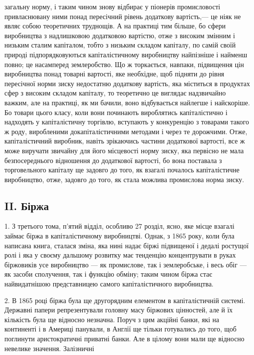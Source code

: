 \parcont{}  %
загальну норму, і таким чином знову відбирає у піонерів промисловості привласнювану ними понад пересічний рівень додаткову
вартість,— це ніяк не являє собою теоретичних труднощів. А на практиці тим більше, бо сфери виробництва з надлишковою
додатковою вартістю, отже з високим змінним і низьким сталим капіталом, тобто з низьким складом капіталу, по самій своїй
природі підпорядковуються капіталістичному виробництву найпізніше і найменш повно; це насамперед землеробство. Що ж
торкається, навпаки, підвищення цін виробництва понад товарні вартості, яке необхідне, щоб підняти до рівня пересічної норми
зиску недостатню додаткову вартість, яка міститься в продуктах сфер з високим складом капіталу, то теоретично це виглядає
надзвичайно важким, але на практиці, як ми бачили, воно відбувається найлегше і найскоріше. Бо товари цього класу, коли вони
починають вироблятись капіталістично і надходять у капіталістичну торгівлю, вступають у конкуренцію з товарами такого ж
роду, виробленими докапіталістичними методами і через те дорожчими. Отже, капіталістичний виробник, навіть зрікаючись
частини додаткової вартості, все ж може виручати звичайну для його місцевості норму зиску, яка первісно не мала
безпосереднього відношення до додаткової вартості, бо вона поставала з торговельного капіталу ще задовго до того, як взагалі
почалось капіталістичне виробництво, отже, задовго до того, як стала можлива промислова норма зиску.

\subsection{II. Біржа}

1. З третього тома, п’ятий відділ, особливо 27 розділ, ясно, яке місце взагалі займає біржа в капіталістичному виробництві. Однак, з 1865 року, коли була написана книга, сталася зміна, яка нині надає біржі підвищеної і дедалі ростущої ролі і яка у
своєму дальшому розвитку має тенденцію концентрувати в руках біржовиків усе виробництво — як промислове, так і землеробське,
і весь обіг — як засоби сполучення, так і функцію обміну; таким чином біржа стає найвидатнішою представницею самого
капіталістичного виробництва.

2. В 1865 році біржа була ще другорядним елементом в капіталістичній системі. Державні папери
репрезентували головну масу біржових цінностей, але й їх кількість була ще відносно незначна. Поруч з цим акційні банки, які
на континенті і в Америці панували, в Англії ще тільки готувались до того, щоб поглинути аристократичні приватні банки. Але
в цілому вони мали ще відносно невелике значення. Залізничні

\parbreak{}  %
